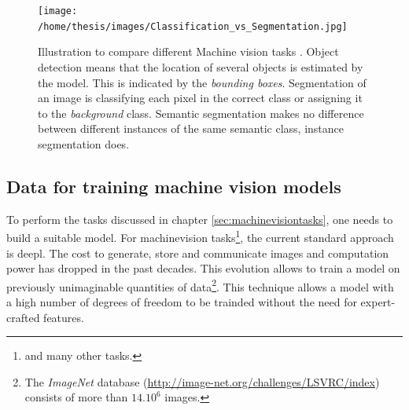 \begin{figure}
    \centering
    \texttt{[image: /home/thesis/images/Classification\_vs\_Segmentation.jpg]}
    \caption{Illustration to compare different Machine vision tasks \cite{SemTorch76:online}. 
    Object detection means that the location of several objects is estimated by the model. This is indicated by the \textit{bounding boxes}.
    Segmentation of an image is classifying each pixel in the correct class or assigning it to the \textit{background} class.
    Semantic segmentation makes no difference between different instances of the same semantic class, instance segmentation does.
    \label{fig:machinevisiontasks}}
\end{figure}


\subsection{Data for training machine vision models\label{sec:trainingData}}
\par{
    To perform the tasks discussed in chapter \ref{sec:machinevisiontasks}, one needs to build a suitable model.
    For \Gls{machinevision} tasks\footnote{and many other tasks.}, the current standard approach is \Gls{deepl}.
    The cost to generate, store and communicate images and computation power has dropped in the past decades.
    This evolution allows to train a model  on previously unimaginable quantities of data\footnote{The \textit{ImageNet} database (\url{http://image-net.org/challenges/LSVRC/index}) consists of more than $14.10^6$ images.}.
    This technique allows a model with a high number of degrees of freedom to be trainded without the need for expert-crafted \Gls{features}. 
}
